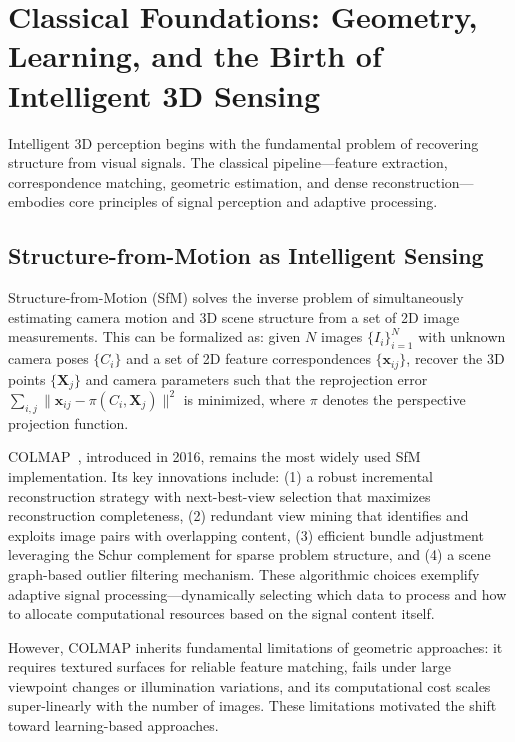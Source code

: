 \documentclass[journal]{IEEEtran}
\begin{document}
\section{Classical Foundations: Geometry, Learning, and the Birth of Intelligent 3D Sensing}
\label{sec:foundations}

Intelligent 3D perception begins with the fundamental problem of recovering structure from visual signals. The classical pipeline---feature extraction, correspondence matching, geometric estimation, and dense reconstruction---embodies core principles of signal perception and adaptive processing.

\subsection{Structure-from-Motion as Intelligent Sensing}

Structure-from-Motion (SfM) solves the inverse problem of simultaneously estimating camera motion and 3D scene structure from a set of 2D image measurements. This can be formalized as: given $N$ images $\{I_i\}_{i=1}^N$ with unknown camera poses $\{C_i\}$ and a set of 2D feature correspondences $\{\mathbf{x}_{ij}\}$, recover the 3D points $\{\mathbf{X}_j\}$ and camera parameters such that the reprojection error $\sum_{i,j} \|\mathbf{x}_{ij} - \pi(C_i, \mathbf{X}_j)\|^2$ is minimized, where $\pi$ denotes the perspective projection function.

COLMAP~\cite{colmap}, introduced in 2016, remains the most widely used SfM implementation. Its key innovations include: (1) a robust incremental reconstruction strategy with next-best-view selection that maximizes reconstruction completeness, (2) redundant view mining that identifies and exploits image pairs with overlapping content, (3) efficient bundle adjustment leveraging the Schur complement for sparse problem structure, and (4) a scene graph-based outlier filtering mechanism. These algorithmic choices exemplify adaptive signal processing---dynamically selecting which data to process and how to allocate computational resources based on the signal content itself.

However, COLMAP inherits fundamental limitations of geometric approaches: it requires textured surfaces for reliable feature matching, fails under large viewpoint changes or illumination variations, and its computational cost scales super-linearly with the number of images. These limitations motivated the shift toward learning-based approaches.
\end{document}
